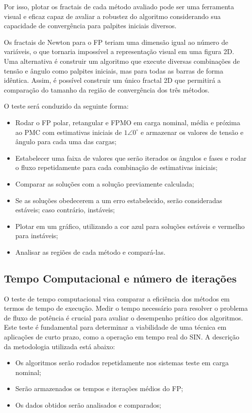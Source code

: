 Por isso, plotar os fractais de cada método avaliado pode ser uma ferramenta visual e eficaz capaz de avaliar a robustez do algoritmo considerando sua capacidade de convergência para palpites iniciais diversos. 

Os fractais de Newton para o \ac{FP} teriam uma dimensão igual ao número de variáveis, o que tornaria impossível a representação visual em uma figura \acs{2D}. Uma alternativa é construir um algoritmo que execute diversas combinações de tensão e ângulo como palpites iniciais, mas para todas as barras de forma idêntica. Assim, é possível construir um único fractal \acs{2D} que permitirá a comparação do tamanho da região de convergência dos três métodos.

O teste será conduzido da seguinte forma:
\begin{itemize}
    \item Rodar o \ac{FP} polar, retangular e \ac{FPMO} em carga nominal, média e próxima ao \ac{PMC} com estimativas iniciais de $1\angle 0 ^{\circ}$ e armazenar os valores de tensão e ângulo para cada uma das cargas;
    \item Estabelecer uma faixa de valores que serão iterados os ângulos e fases e rodar o fluxo repetidamente para cada combinação de estimativas iniciais;
    \item Comparar as soluções com a solução previamente calculada;
    \item Se as soluções obedecerem a um erro estabelecido, serão consideradas estáveis; caso contrário, instáveis;
    \item Plotar em um gráfico, utilizando a cor azul para soluções estáveis e vermelho para instáveis;
    \item Analisar as regiões de cada método e compará-las.
\end{itemize}

\subsection{Tempo Computacional e número de iterações}
O teste de tempo computacional visa comparar a eficiência dos métodos em termos de tempo de execução. Medir o tempo necessário para resolver o problema de fluxo de potência é crucial para avaliar o desempenho prático dos algoritmos. Este teste é fundamental para determinar a viabilidade de uma técnica em aplicações de curto prazo, como a operação em tempo real do \ac{SIN}. A descrição da metodologia utilizada está abaixo:

\begin{itemize}
    \item Os algoritmos serão rodados repetidamente nos sistemas teste em carga nominal;
    \item Serão armazenados os tempos e iterações médios do \ac{FP};
    \item Os dados obtidos serão analisados e comparados;
\end{itemize}